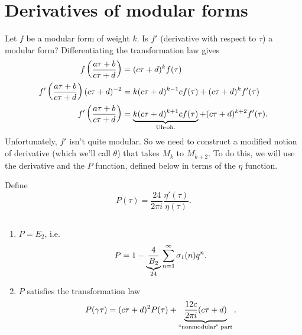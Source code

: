 \section{Derivatives of modular forms}
Let $f$ be a modular form of weight $k$. Is $f'$ (derivative with respect to $\tau$) a modular form? Differentiating the transformation law gives
\begin{align}
\nonumber f\left( {\frac{a\tau+b}{c\tau+d}} \right)&=(c\tau+d)^k f(\tau)\\
\nonumber f'\left( {\frac{a\tau+b}{c\tau+d}} \right)(c\tau+d)^{-2}&=k(c\tau+d)^{k-1} cf(\tau)+(c\tau+d)^k f'(\tau)\\
f'\left( {\frac{a\tau+b}{c\tau+d}} \right)&=\underbrace{k(c\tau+d)^{k+1} cf(\tau)}_{\text{Uh-oh.}}+(c\tau+d)^{k+2} f'(\tau).\label{fdifftrans}
\end{align}
Unfortunately, $f'$ isn't quite modular. So we need to construct a modified notion of derivative (which we'll call $\theta$) that takes $M_k$ to $M_{k+2}$. To do this, we will use the derivative and the $P$ function, defined below in terms of the $\eta$ function. 
\begin{df}
Define
\[P(\tau)=\frac{24}{2\pi i} \frac{\eta'(\tau)}{\eta(\tau)}.\]
\end{df}
\begin{thm}$\,$
\begin{enumerate}
\item
$P=E_2$, i.e.
\[
P=1-\underbrace{\frac{4}{B_2}}_{24}\sum_{n=1}^{\infty} \sigma_1(n)q^n.
\]
\item
$P$ satisfies the transformation law
\begin{equation}\label{Ptrans}
P(\gamma \tau)=(c\tau+d)^2P(\tau)+\underbrace{\frac{12c}{2\pi i}(c\tau+d)}_{\text{``nonmodular" part}}.
\end{equation}
\end{enumerate}
\end{thm}

